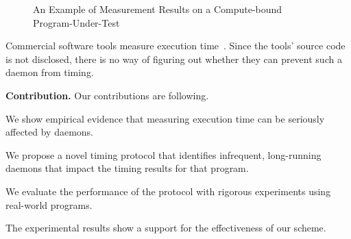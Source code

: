 \documentclass[letter]{ieice}
\begin{document}
\begin{figure}[t]
	\centering
	\caption{{\color{blue}An Example of Measurement Results on a \linebreak \hbox{Compute-bound} 
	Program-Under-Test}~\label{fig:meas_comp}}
	\vspace{-.18in}
\end{figure} 

Commercial software tools measure execution time~\cite{VTune,TimeSys,WindView}. 
Since the tools' source code is not disclosed, there is no way of figuring out 
whether they can prevent such a daemon from timing. 

\vspace{0.05in}
{\bf Contribution.} 
Our contributions are following.
\vspace{-0.05in}
\begin{itemize}

\item We show empirical evidence that 
measuring execution time 
can be seriously affected by daemons.

\item We propose a novel timing protocol that
identifies infrequent, long-running daemons that impact the timing results for that program. 

{\color{blue}
\item We evaluate the performance of the protocol with rigorous experiments 
using real-world programs.
}

\item The experimental results show a support for the effectiveness of our scheme. 

\end{itemize}
\vspace{-0.05in}
\end{document}
